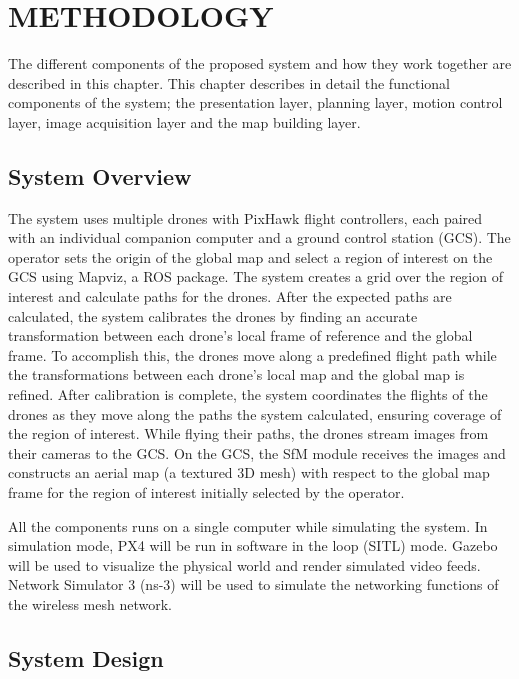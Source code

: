 \setlength{\parindent}{0pt}  
\setlength{\parskip}{0mm}
\setlength{\baselineskip}{1.6em}

\chapter{METHODOLOGY}
\label{ch:methodology}

The different components of the proposed system and how they work together are described in this chapter. This chapter describes in detail the functional components of the system; the presentation layer, planning layer, motion control layer, image acquisition layer and the map building layer.

\section{System Overview}
The system uses multiple drones with PixHawk flight controllers, each paired with an individual companion computer and a ground control station (GCS). The operator sets the origin of the global map and select a region of interest on the GCS using Mapviz, a ROS package. The system creates a grid over the region of interest and calculate paths for the drones. After the expected paths are calculated, the system calibrates the drones by finding an accurate transformation between each drone's local frame of reference and the global frame. To accomplish this, the drones move along a predefined flight path while the transformations between each drone's local map and the global map is refined. After calibration is complete, the system coordinates the flights of the drones as they move along the paths the system calculated, ensuring coverage of the region of interest. While flying their paths, the drones stream images from their cameras to the GCS. On the GCS, the SfM module receives the images and constructs an aerial map (a textured 3D mesh) with respect to the global map frame for the region of interest initially selected by the operator.


All the components runs on a single computer while simulating the system. In simulation mode, PX4 will be run in software in the loop (SITL) mode. Gazebo will be used to visualize the physical world and render simulated video feeds. Network Simulator 3 (ns-3) will be used to simulate the networking functions of the wireless mesh network.

\section{System Design}

